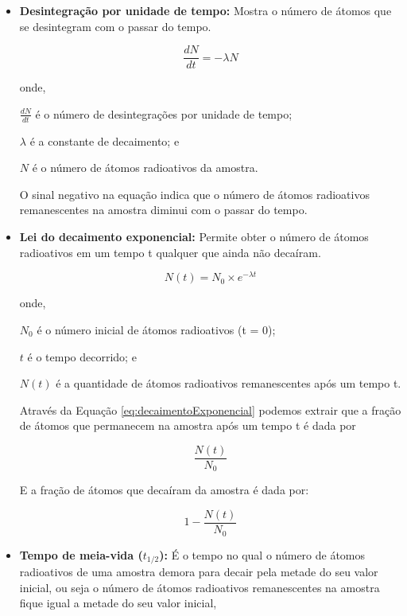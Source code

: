 \documentclass[11pt,a4paper]{article}
\begin{document}
		\begin{itemize}
			\item \textbf{Desintegração por unidade de tempo:} Mostra o número de átomos que se desintegram com o passar do tempo. 

				\begin{equation}
					\frac{dN}{dt} = -\lambda N
					\label{eq:DesintegraçãoPorUnidadeDeTempo}
				\end{equation}
		
				onde, 

				$\frac{dN}{dt}$ é o número de desintegrações por unidade de tempo;

				$\lambda$ é a constante de decaimento; e

				$N$ é o número de átomos radioativos da amostra.

				O sinal negativo na equação indica que o número de átomos radioativos remanescentes na amostra diminui com o passar do tempo. 

			\item \textbf{Lei do decaimento exponencial: } Permite obter o número de átomos radioativos em  um tempo t qualquer que ainda não decaíram.

				\begin{equation}
					N(t) = N_0 \times e^{-\lambda t}
					\label{eq:decaimentoExponencial}
				\end{equation}
				
				onde,

				$N_0$ é o número inicial de átomos radioativos (t = 0);
				
				$t$ é o tempo decorrido; e

				$N(t)$ é a quantidade de átomos radioativos remanescentes após um tempo t.

				Através da Equação \ref{eq:decaimentoExponencial} podemos extrair que a fração de átomos que permanecem na amostra após um tempo t é dada por 

				\begin{equation}
					\frac{N(t)}{N_0}
				\end{equation}

				E a fração de átomos que decaíram da amostra é dada por:

				\begin{equation}
					1 - \frac{N(t)}{N_0}
				\end{equation}

			\item \textbf{Tempo de meia-vida ($t_{1/2}$): } É o tempo no qual o número de átomos radioativos de uma amostra demora para decair pela metade do seu valor inicial, ou seja o número de átomos radioativos remanescentes na amostra fique igual a metade do seu valor inicial, 
			

\end{itemize}
\end{document}
